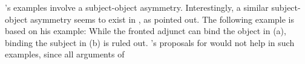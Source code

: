 \documentclass[output=paper
 	        ,biblatex
                ,babelshorthands
                ,newtxmath
                ,draftmode
                ,colorlinks, citecolor=brown
]{langscibook}
\begin{document}
\citeauthor{HL95b}'s examples involve a subject-object asymmetry. Interestingly, a similar
subject-object asymmetry seems to exist in , as \citet[]{Grewendorf85a} pointed
out. The following example is based on his example:
\eal
{}
\zl
While the fronted adjunct can bind the object in (a), binding the subject in (b) is
ruled out. \citeauthor{Walker2011a}'s proposals for  would not help in such examples, since all arguments of
\end{document}
